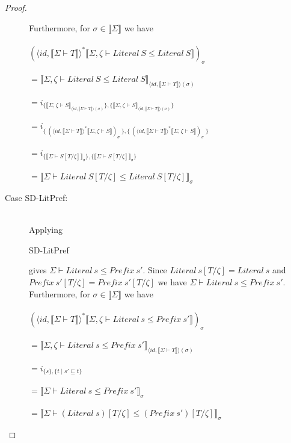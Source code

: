 \documentclass{article}
\newcommand{\sem}[1]{\llbracket #1 \rrbracket}
\begin{document}
\begin{proof}
\begin{description}
Furthermore, for $\sigma \in \sem{\Sigma}$ we have\\~\\
$(\langle \mathit{id},\sem{\Sigma \vdash T} \rangle^* \sem{\Sigma,\zeta \vdash \mathit{Literal}~S \leq \mathit{Literal~S}})_\sigma$\\~\\
$= \sem{\Sigma,\zeta \vdash \mathit{Literal}~S \leq \mathit{Literal}~S}_{\langle \mathit{id}, \sem{\Sigma \vdash T}\rangle(\sigma)}$\\~\\
$= i_{\{ \sem{\Sigma,\zeta \vdash S}_{\langle \mathit{id}, \sem{\Sigma \vdash T}\rangle(\sigma)} \}, \{ \sem{\Sigma,\zeta \vdash S}_{\langle \mathit{id}, \sem{\Sigma \vdash T}\rangle(\sigma)} \}}$\\~\\
$= i_{\{~(\langle \mathit{id}, \sem{\Sigma \vdash T}\rangle^*\sem{\Sigma,\zeta \vdash S})_\sigma~\}, \{~(\langle \mathit{id}, \sem{\Sigma \vdash T}\rangle^*\sem{\Sigma,\zeta \vdash S})_\sigma~\}}$\\~\\
$= i_{ \{ \sem{\Sigma \vdash S[T/\zeta]}_{\sigma} \}, \{ \sem{\Sigma \vdash S[T/\zeta]}_{\sigma} \} }$\\~\\
$= \sem{\Sigma \vdash \mathit{Literal}~S[T/\zeta] \leq \mathit{Literal}~S[T/\zeta]}_{\sigma}$

\item[Case SD-LitPref:]~\\

Applying \begin{sc}SD-LitPref\end{sc} gives $\Sigma \vdash \mathit{Literal}~s \leq \mathit{Prefix}~s'$. Since $\mathit{Literal}~s[T/\zeta] = \mathit{Literal}~s$ and $\mathit{Prefix~s'}[T/\zeta] = \mathit{Prefix}~s'[T/\zeta]$ we have $\Sigma \vdash \mathit{Literal}~s \leq \mathit{Prefix}~s'$. Furthermore, for $\sigma \in \sem{\Sigma}$ we have\\~\\
$(\langle \mathit{id}, \sem{\Sigma \vdash T} \rangle^* \sem{\Sigma,\zeta \vdash \mathit{Literal}~s \leq \mathit{Prefix}~s'})_\sigma$\\~\\
$= \sem{\Sigma,\zeta \vdash \mathit{Literal}~s \leq \mathit{Prefix}~s'}_{\langle \mathit{id}, \sem{\Sigma \vdash T} \rangle(\sigma)}$\\~\\
$= i_{\{ s \}, \{ t \mid s' \sqsubseteq t \}}$\\~\\
$= \sem{\Sigma \vdash \mathit{Literal}~s \leq \mathit{Prefix}~s'}_{\sigma}$\\~\\
$= \sem{\Sigma \vdash (\mathit{Literal}~s)[T/\zeta] \leq (\mathit{Prefix}~s')[T/\zeta]}_{\sigma}$

\end{description}

\end{proof}
\end{document}
